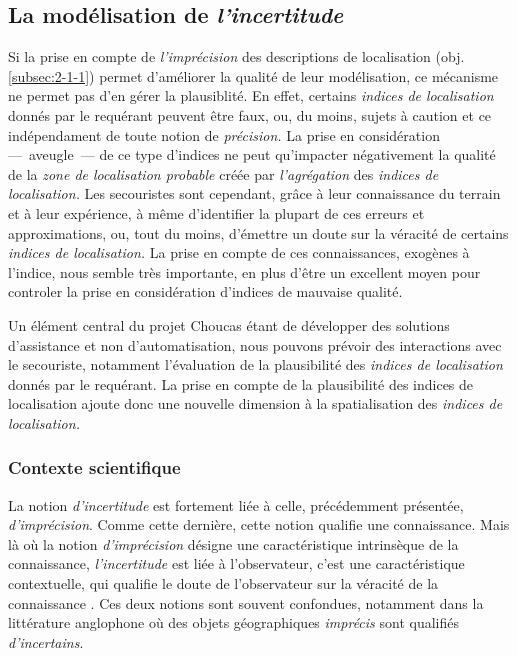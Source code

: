 \subsection{La modélisation de \emph{l'incertitude}}
\label{subsec:2-1-3}

Si la prise en compte de \emph{l'imprécision} des descriptions de
localisation (obj. \ref{subsec:2-1-1}) permet d'améliorer la qualité
de leur modélisation, ce mécanisme ne permet pas d'en gérer la
plausiblité. En effet, certains \emph{indices de localisation} donnés
par le requérant peuvent être faux, ou, du moins, sujets à caution et
ce indépendament de toute notion de \emph{précision.} La prise en
considération ---~aveugle~--- de ce type d'indices ne peut qu'impacter
négativement la qualité de la \emph{zone de localisation probable}
créée par \emph{l'agrégation} des \emph{indices de localisation.} Les
secouristes sont cependant, grâce à leur connaissance du terrain et à
leur expérience, à même d'identifier la plupart de ces erreurs et
approximations, ou, tout du moins, d’émettre un doute sur la véracité
de certains \emph{indices de localisation.} La prise en compte de ces
connaissances, exogènes à l'indice, nous semble très importante, en
plus d'être un excellent moyen pour controler la prise en
considération d'indices de mauvaise qualité.

Un élément central du projet Choucas étant de développer des solutions
d'assistance et non d'automatisation, nous pouvons prévoir des
interactions avec le secouriste, notamment l'évaluation de la
plausibilité des \emph{indices de localisation} donnés par le
requérant. La prise en compte de la plausibilité des indices de
localisation ajoute donc une nouvelle dimension à la spatialisation
des \emph{indices de localisation.}

\subsubsection{Contexte scientifique}

La notion \emph{d'incertitude} est fortement liée à celle,
précédemment présentée, \emph{d'imprécision}. Comme cette dernière,
cette notion qualifie une connaissance. Mais là où la notion
\emph{d'imprécision} désigne une caractéristique intrinsèque de la
connaissance, \emph{l'incertitude} est liée à l'observateur, c'est une
caractéristique contextuelle, qui qualifie le doute de l'observateur
sur la véracité de la connaissance \autocite{Bunel2020}. Ces deux
notions sont souvent confondues, notamment dans la littérature
anglophone où des objets géographiques \emph{imprécis} sont qualifiés
\emph{d'incertains}.

